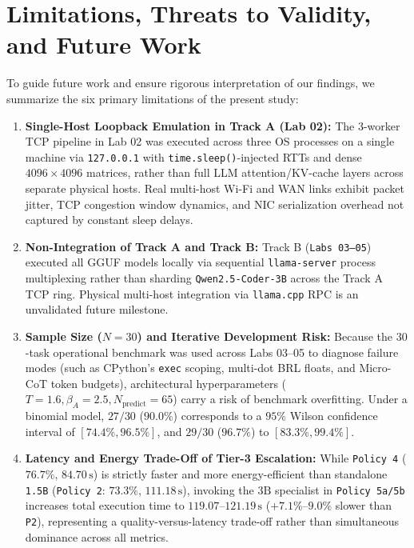 \documentclass[10pt,a4paper]{article}
\begin{document}
\section{Limitations, Threats to Validity, and Future Work}
\label{sec:limitations}

To guide future work and ensure rigorous interpretation of our findings, we summarize the six primary limitations of the present study:
\begin{enumerate}
    \item \textbf{Single-Host Loopback Emulation in Track A (Lab 02):} The 3-worker TCP pipeline in Lab 02 was executed across three OS processes on a single machine via \texttt{127.0.0.1} with \texttt{time.sleep()}-injected RTTs and dense $4096 \times 4096$ matrices, rather than full LLM attention/KV-cache layers across separate physical hosts. Real multi-host Wi-Fi and WAN links exhibit packet jitter, TCP congestion window dynamics, and NIC serialization overhead not captured by constant sleep delays.
    \item \textbf{Non-Integration of Track A and Track B:} Track B (\texttt{Labs 03--05}) executed all GGUF models locally via sequential \texttt{llama-server} process multiplexing rather than sharding \texttt{Qwen2.5-Coder-3B} across the Track A TCP ring. Physical multi-host integration via \texttt{llama.cpp} RPC is an unvalidated future milestone.
    \item \textbf{Sample Size ($N=30$) and Iterative Development Risk:} Because the $30$-task operational benchmark was used across Labs 03--05 to diagnose failure modes (such as CPython's \texttt{exec} scoping, multi-dot BRL floats, and Micro-CoT token budgets), architectural hyperparameters ($T=1.6, \beta_A=2.5, N_{\text{predict}}=65$) carry a risk of benchmark overfitting. Under a binomial model, $27/30$ ($90.0\%$) corresponds to a $95\%$ Wilson confidence interval of $[74.4\%, 96.5\%]$, and $29/30$ ($96.7\%$) to $[83.3\%, 99.4\%]$.
    \item \textbf{Latency and Energy Trade-Off of Tier-3 Escalation:} While \texttt{Policy 4} ($76.7\%$, $84.70\,\text{s}$) is strictly faster and more energy-efficient than standalone \texttt{1.5B} (\texttt{Policy 2}: $73.3\%$, $111.18\,\text{s}$), invoking the $3\text{B}$ specialist in \texttt{Policy 5a/5b} increases total execution time to $119.07\text{--}121.19\,\text{s}$ ($+7.1\%\text{--}9.0\%$ slower than \texttt{P2}), representing a quality-versus-latency trade-off rather than simultaneous dominance across all metrics.

\end{enumerate}
\end{document}
